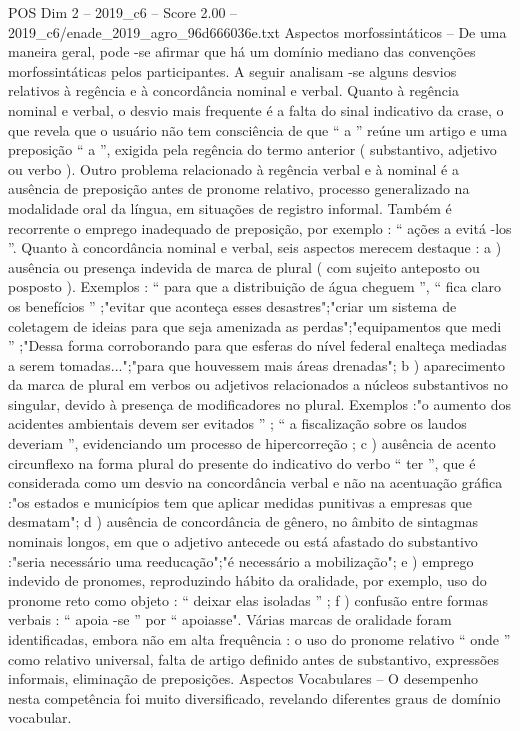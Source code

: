 \begin{textsample}{POS Dim 2 – 2019\_c6 – Score 2.00 – 2019\_c6/enade\_2019\_agro\_96d666036e.txt}
Aspectos morfossintáticos – De uma maneira geral, pode -se afirmar que há um domínio mediano das convenções morfossintáticas pelos participantes.
A seguir analisam -se alguns desvios relativos à regência e à concordância nominal e verbal.
Quanto à regência nominal e verbal, o desvio mais frequente é a falta do sinal indicativo da crase, o que revela que o usuário não tem consciência de que “ a ” reúne um artigo e uma preposição “ a ”, exigida pela regência do termo anterior ( substantivo, adjetivo ou verbo ).
Outro problema relacionado à regência verbal e à nominal é a ausência de preposição antes de pronome relativo, processo generalizado na modalidade oral da língua, em situações de registro informal.
Também é recorrente o emprego inadequado de preposição, por exemplo : “ ações a evitá -los ”.
Quanto à concordância nominal e verbal, seis aspectos merecem destaque : a ) ausência ou presença indevida de marca de plural ( com sujeito anteposto ou posposto ).
Exemplos : “ para que a distribuição de água cheguem ”, “ fica claro os benefícios ” ;"evitar que aconteça esses desastres";"criar um sistema de coletagem de ideias para que seja amenizada as perdas";"equipamentos que medi ” ;"Dessa forma corroborando para que esferas do nível federal enalteça mediadas a serem tomadas...";"para que houvessem mais áreas drenadas"; b ) aparecimento da marca de plural em verbos ou adjetivos relacionados a núcleos substantivos no singular, devido à presença de modificadores no plural.
Exemplos :"o aumento dos acidentes ambientais devem ser evitados ” ; “ a fiscalização sobre os laudos deveriam ”, evidenciando um processo de hipercorreção ; c ) ausência de acento circunflexo na forma plural do presente do indicativo do verbo “ ter ”, que é considerada como um desvio na concordância verbal e não na acentuação gráfica :"os estados e municípios tem que aplicar medidas punitivas a empresas que desmatam"; d ) ausência de concordância de gênero, no âmbito de sintagmas nominais longos, em que o adjetivo antecede ou está afastado do substantivo :"seria necessário uma reeducação";"é necessário a mobilização"; e ) emprego indevido de pronomes, reproduzindo hábito da oralidade, por exemplo, uso do pronome reto como objeto : “ deixar elas isoladas ” ; f ) confusão entre formas verbais : “ apoia -se ” por “ apoiasse".
Várias marcas de oralidade foram identificadas, embora não em alta frequência : o uso do pronome relativo “ onde ” como relativo universal, falta de artigo definido antes de substantivo, expressões informais, eliminação de preposições.
Aspectos Vocabulares – O desempenho nesta competência foi muito diversificado, revelando diferentes graus de domínio vocabular.

\end{textsample}
